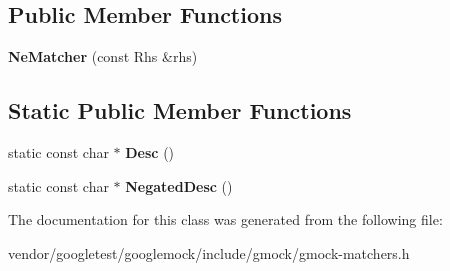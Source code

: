 \subsection*{Public Member Functions}
\begin{DoxyCompactItemize}
\item 
\mbox{\label{classtesting_1_1internal_1_1_ne_matcher_a64842882811cc96624c87119c51edd3e}} 
{\bfseries Ne\+Matcher} (const Rhs \&rhs)
\end{DoxyCompactItemize}
\subsection*{Static Public Member Functions}
\begin{DoxyCompactItemize}
\item 
\mbox{\label{classtesting_1_1internal_1_1_ne_matcher_a2ec33febe5471f9d435b4dc9f5cda564}} 
static const char $\ast$ {\bfseries Desc} ()
\item 
\mbox{\label{classtesting_1_1internal_1_1_ne_matcher_a9ea152391b69d422ba2a88c3d2d2dae5}} 
static const char $\ast$ {\bfseries Negated\+Desc} ()
\end{DoxyCompactItemize}


The documentation for this class was generated from the following file\+:\begin{DoxyCompactItemize}
\item 
vendor/googletest/googlemock/include/gmock/gmock-\/matchers.\+h\end{DoxyCompactItemize}
